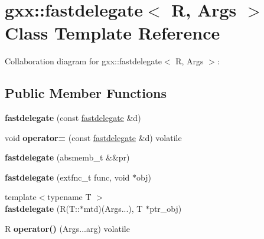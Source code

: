 \hypertarget{classgxx_1_1fastdelegate}{}\section{gxx\+:\+:fastdelegate$<$ R, Args $>$ Class Template Reference}
\label{classgxx_1_1fastdelegate}


Collaboration diagram for gxx\+:\+:fastdelegate$<$ R, Args $>$\+:
\subsection*{Public Member Functions}
\begin{DoxyCompactItemize}
\item 
{\bfseries fastdelegate} (const \hyperlink{classgxx_1_1fastdelegate}{fastdelegate} \&d)\hypertarget{classgxx_1_1fastdelegate_a6f44f6a4a2d8259e5e590ceb9e58ac3e}{}\label{classgxx_1_1fastdelegate_a6f44f6a4a2d8259e5e590ceb9e58ac3e}

\item 
void {\bfseries operator=} (const \hyperlink{classgxx_1_1fastdelegate}{fastdelegate} \&d) volatile\hypertarget{classgxx_1_1fastdelegate_a4c3883445f45325e8d4def105e3db034}{}\label{classgxx_1_1fastdelegate_a4c3883445f45325e8d4def105e3db034}

\item 
{\bfseries fastdelegate} (absmemb\+\_\+t \&\&pr)\hypertarget{classgxx_1_1fastdelegate_a0ed9883a0077673a5607d240e1f2eab3}{}\label{classgxx_1_1fastdelegate_a0ed9883a0077673a5607d240e1f2eab3}

\item 
{\bfseries fastdelegate} (extfnc\+\_\+t func, void $\ast$obj)\hypertarget{classgxx_1_1fastdelegate_a54e9db865ad0866960dd4af79fc01a4a}{}\label{classgxx_1_1fastdelegate_a54e9db865ad0866960dd4af79fc01a4a}

\item 
{\footnotesize template$<$typename T $>$ }\\{\bfseries fastdelegate} (R(T\+::$\ast$mtd)(Args...), T $\ast$ptr\+\_\+obj)\hypertarget{classgxx_1_1fastdelegate_ad6f432da1279e7ea6c6116635a117849}{}\label{classgxx_1_1fastdelegate_ad6f432da1279e7ea6c6116635a117849}

\item 
R {\bfseries operator()} (Args...\+arg) volatile\hypertarget{classgxx_1_1fastdelegate_a0529db2182e3dfceb3b7781fb4149e6b}{}\label{classgxx_1_1fastdelegate_a0529db2182e3dfceb3b7781fb4149e6b}

\end{DoxyCompactItemize}
